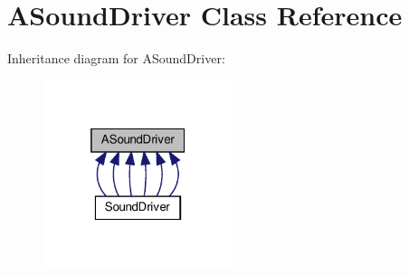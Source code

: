 \hypertarget{classASoundDriver}{}\section{A\+Sound\+Driver Class Reference}
\label{classASoundDriver}


Inheritance diagram for A\+Sound\+Driver\+:
\nopagebreak
\begin{figure}[H]
\begin{center}
\leavevmode
\includegraphics[width=157pt]{classASoundDriver__inherit__graph}
\end{center}
\end{figure}
